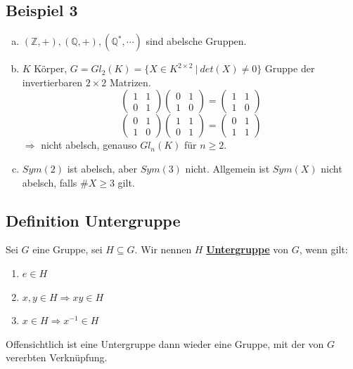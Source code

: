 \documentclass[a4paper, pagesize=pdftex, pdftex, twoside, headsepline, index=totoc,toc=listof, fontsize=10pt, cleardoublepage=empty, headinclude, DIV=13, BCOR=13mm]{scrartcl}
\newcommand{\bet}[1]{\uline{\textbf{#1}}} %
\begin{document}
\subsection{Beispiel 3}
\label{sub: beispiel_3}
\begin{enumerate}[(a)]
	\item $(\mathds{Z}, +), (\mathds{Q}, +), (\mathds{Q}^*,\cdots)$ sind abelsche Gruppen.
	\item $K$ Körper, $G=Gl_2(K)=\{X \in K^{2\times 2}~ |~ det(X)\not= 0 \}$ Gruppe der invertierbaren $2 \times 2$ Matrizen.\\
\[
	\begin{pmatrix}	1 & 1\\ 0 & 1 \end{pmatrix}
	\begin{pmatrix} 0 & 1\\	1 & 0 \end{pmatrix}
	=
	\begin{pmatrix}	1 & 1\\	1 & 0 \end{pmatrix}
\]
\[
	\begin{pmatrix} 0 & 1\\	1 & 0 \end{pmatrix}
	\begin{pmatrix} 1 & 1\\ 0 & 1 \end{pmatrix}
	=
	\begin{pmatrix} 0 & 1\\ 1 & 1 \end{pmatrix}
\]
	$\Rightarrow$ nicht abelsch, genauso $Gl_n(K)$ für $n\ge 2$.
	\item $Sym(2)$ ist abelsch, aber $Sym(3)$ nicht. Allgemein ist $Sym(X)$ nicht abelsch, falls $\#X \ge 3$ gilt.
\end{enumerate}

\subsection{Definition Untergruppe}
\label{sub: def_untergruppe}
Sei $G$ eine Gruppe, sei $H\subseteq G$. Wir nennen $H$ \bet{Untergruppe}  von $G$, wenn gilt:
\begin{enumerate}[(UG1)]
	\item $e\in H$
	\item $x,y\in H \Rightarrow xy\in H$
	\item $x\in H \Rightarrow x^{-1} \in H$
\end{enumerate}
Offensichtlich ist eine Untergruppe dann wieder eine Gruppe, mit der von $G$ vererbten Verknüpfung.
\end{document}
